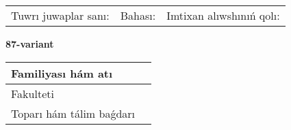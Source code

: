 \documentclass{article}
\begin{document}
\vspace{1cm}

\begin{tabular}{lll}
Tuwrı juwaplar sanı: \underline{\hspace{1.5cm}} & 
Bahası: \underline{\hspace{1.5cm}} & 
Imtixan alıwshınıń qolı: \underline{\hspace{2cm}} \\
\end{tabular}

\egroup

\newpage


\textbf{87-variant}\\

\bgroup
\def\arraystretch{1.6} %

\begin{tabular}{|m{5.7cm}|m{9.5cm}|}
\hline
Familiyası hám atı & \\
\hline
Fakulteti  & \\
\hline
Toparı hám tálim baǵdarı  & \\
\hline
\end{tabular}

\vspace{1cm}
\end{document}
